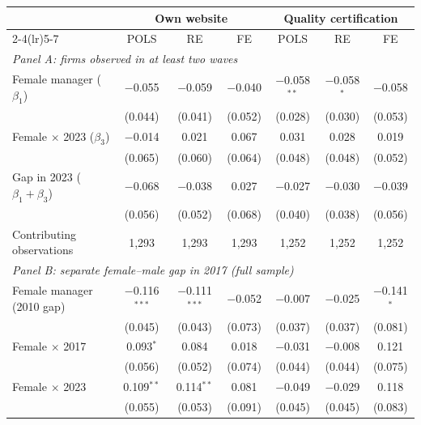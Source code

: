 \begin{tabular}{lcccccc}
\toprule
 & \multicolumn{3}{c}{Own website} & \multicolumn{3}{c}{Quality certification} \\
\cmidrule(lr){2-4}\cmidrule(lr){5-7}
 & POLS & RE & FE & POLS & RE & FE \\
\midrule
\multicolumn{7}{l}{\textit{Panel A: firms observed in at least two waves}} \\
Female manager ($\beta_1$) & $-$0.055 & $-$0.059 & $-$0.040 & $-$0.058$^{**}$ & $-$0.058$^{*}$ & $-$0.058 \\
 & (0.044) & (0.041) & (0.052) & (0.028) & (0.030) & (0.053) \\
Female $\times$ 2023 ($\beta_3$) & $-$0.014 & 0.021 & 0.067 & 0.031 & 0.028 & 0.019 \\
 & (0.065) & (0.060) & (0.064) & (0.048) & (0.048) & (0.052) \\
Gap in 2023 ($\beta_1+\beta_3$) & $-$0.068 & $-$0.038 & 0.027 & $-$0.027 & $-$0.030 & $-$0.039 \\
 & (0.056) & (0.052) & (0.068) & (0.040) & (0.038) & (0.056) \\
Contributing observations & 1,293 & 1,293 & 1,293 & 1,252 & 1,252 & 1,252 \\
\midrule
\multicolumn{7}{l}{\textit{Panel B: separate female--male gap in 2017 (full sample)}} \\
Female manager (2010 gap) & $-$0.116$^{***}$ & $-$0.111$^{***}$ & $-$0.052 & $-$0.007 & $-$0.025 & $-$0.141$^{*}$ \\
 & (0.045) & (0.043) & (0.073) & (0.037) & (0.037) & (0.081) \\
Female $\times$ 2017 & 0.093$^{*}$ & 0.084 & 0.018 & $-$0.031 & $-$0.008 & 0.121 \\
 & (0.056) & (0.052) & (0.074) & (0.044) & (0.044) & (0.075) \\
Female $\times$ 2023 & 0.109$^{**}$ & 0.114$^{**}$ & 0.081 & $-$0.049 & $-$0.029 & 0.118 \\
 & (0.055) & (0.053) & (0.091) & (0.045) & (0.045) & (0.083) \\
\bottomrule
\end{tabular}
